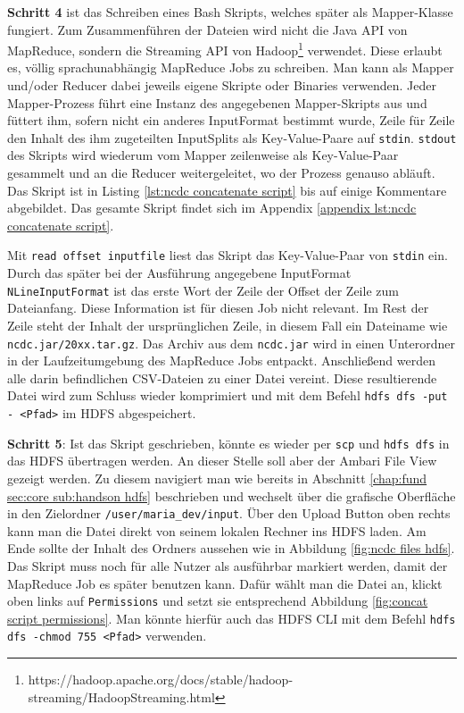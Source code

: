 \textbf{Schritt 4} ist das Schreiben eines Bash Skripts, welches später als Mapper-Klasse fungiert. Zum Zusammenführen der Dateien wird nicht die Java API von MapReduce, sondern die Streaming API von Hadoop\footnote{https://hadoop.apache.org/docs/stable/hadoop-streaming/HadoopStreaming.html} verwendet. Diese erlaubt es, völlig sprachunabhängig MapReduce Jobs zu schreiben. Man kann als Mapper und/oder Reducer dabei jeweils eigene Skripte oder Binaries verwenden. Jeder Mapper-Prozess führt eine Instanz des angegebenen Mapper-Skripts aus und füttert ihm, sofern nicht ein anderes InputFormat bestimmt wurde, Zeile für Zeile den Inhalt des ihm zugeteilten InputSplits als Key-Value-Paare auf \verb|stdin|. \verb|stdout| des Skripts wird wiederum vom Mapper zeilenweise als Key-Value-Paar gesammelt und an die Reducer weitergeleitet, wo der Prozess genauso abläuft. Das Skript ist in Listing \ref{lst:ncdc concatenate script} bis auf einige Kommentare abgebildet. Das gesamte Skript findet sich im Appendix \ref{appendix lst:ncdc concatenate script}.    



Mit \verb|read offset inputfile| liest das Skript das Key-Value-Paar von \verb|stdin| ein. Durch das später bei der Ausführung angegebene InputFormat \verb|NLineInputFormat| ist das erste Wort der Zeile der Offset der Zeile zum Dateianfang. Diese Information ist für diesen Job nicht relevant. Im Rest der Zeile steht der Inhalt der ursprünglichen Zeile, in diesem Fall ein Dateiname wie \verb|ncdc.jar/20xx.tar.gz|. 
Das Archiv aus dem \verb|ncdc.jar| wird in einen Unterordner in der Laufzeitumgebung des MapReduce Jobs entpackt. Anschließend werden alle darin befindlichen CSV-Dateien zu einer Datei vereint. Diese resultierende Datei wird zum Schluss wieder komprimiert und mit dem Befehl \verb|hdfs dfs -put - <Pfad>| im HDFS abgespeichert. 
\par
\textbf{Schritt 5}: Ist das Skript geschrieben, könnte es wieder per \verb|scp| und \verb|hdfs dfs| in das HDFS übertragen werden. An dieser Stelle soll aber der Ambari File View gezeigt werden. Zu diesem navigiert man wie bereits in Abschnitt \ref{chap:fund sec:core sub:handson hdfs} beschrieben und wechselt über die grafische Oberfläche in den Zielordner \verb|/user/maria_dev/input|. Über den Upload Button oben rechts kann man die Datei direkt von seinem lokalen Rechner ins HDFS laden. Am Ende sollte der Inhalt des Ordners aussehen wie in Abbildung \ref{fig:ncdc files hdfs}. Das Skript muss noch für alle Nutzer als ausführbar markiert werden, damit der MapReduce Job es später benutzen kann. Dafür wählt man die Datei an, klickt oben links auf \verb|Permissions| und setzt sie entsprechend Abbildung \ref{fig:concat script permissions}. Man könnte hierfür auch das HDFS CLI mit dem Befehl \verb|hdfs dfs -chmod 755 <Pfad>| verwenden.

